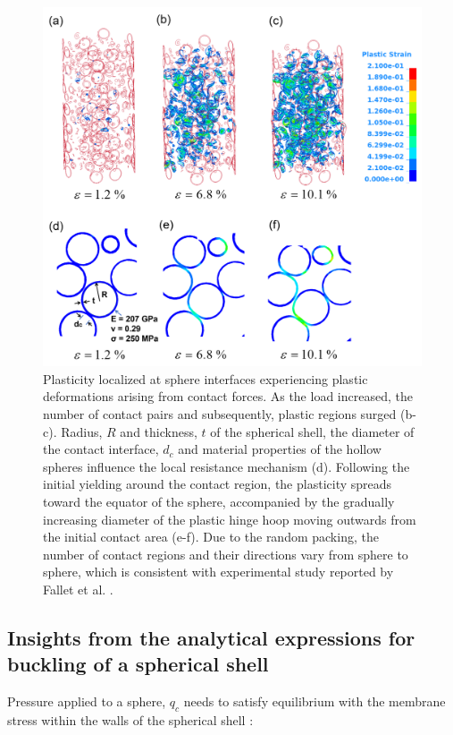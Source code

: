 \documentclass[review]{elsarticle}
\begin{document}
\begin{figure}[htbp]
	\begin{center}
		\includegraphics[width=0.80\linewidth]
		{Tex-Figures/Fig11-PlasticBuckling.png}
		\caption{Plasticity localized at sphere interfaces experiencing plastic deformations arising from contact forces. As the load increased, the number of contact pairs and subsequently, plastic regions surged (b-c). Radius, $R$ and thickness, $t$ of the spherical shell, the diameter of the contact interface, $d_c$ and material properties of the hollow spheres influence the local resistance mechanism (d). Following the initial yielding around the contact region, the plasticity spreads toward the equator of the sphere, accompanied by the gradually increasing diameter of the plastic hinge hoop moving outwards from the initial contact area (e-f). Due to the random packing, the number of contact regions and their directions vary from sphere to sphere, which is consistent with experimental study reported by Fallet et al. \cite{Fallet2008}.}
		\label{Fig:SimulatedBuckling}
	\end{center}
\end{figure}


\subsection{Insights from the analytical expressions for buckling of a spherical shell}

Pressure applied to a sphere, $q_c$ needs to satisfy equilibrium with the membrane stress within the walls of the spherical shell \cite{TimGer2009}:
\end{document}
